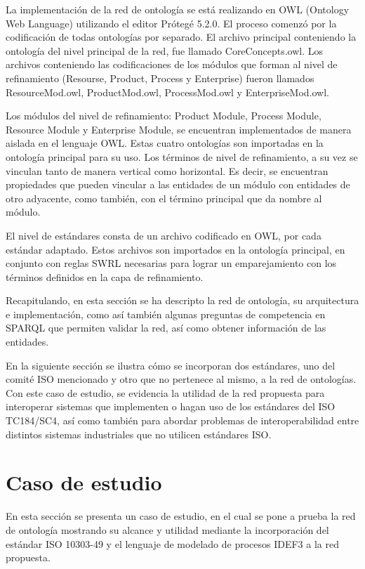 \documentclass[journal]{IEEEtran}
\begin{document}
La implementaci\'on de la red de ontolog\'ia se est\'a realizando en OWL (Ontology Web Language) utilizando el editor Pr\'oteg\'e 5.2.0. El proceso comenz\'o por la codificaci\'on de todas ontolog\'ias por separado. El archivo principal conteniendo la ontolog\'ia del nivel principal de la red, fue llamado CoreConcepts.owl. Los archivos conteniendo las codificaciones de los m\'odulos que forman al nivel de refinamiento (Resourse, Product, Process y Enterprise) fueron llamados ResourceMod.owl, ProductMod.owl, ProcessMod.owl y EnterpriseMod.owl. 

Los m\'odulos del nivel de refinamiento: Product Module, Process Module, Resource Module y Enterprise Module, se encuentran implementados de manera aislada en el lenguaje OWL. Estas cuatro ontolog\'ias son importadas en la ontolog\'ia   principal para su uso. Los t\'erminos de nivel de refinamiento, a su vez se vinculan tanto de manera vertical como horizontal. Es decir, se encuentran propiedades que pueden vincular a las entidades de un m\'odulo con entidades de otro adyacente, como tambi\'en, con el t\'ermino principal que da nombre al m\'odulo. 

El nivel de est\'andares consta de un archivo codificado en OWL, por cada est\'andar adaptado. Estos archivos son importados en la ontolog\'ia principal, en conjunto con reglas SWRL necesarias para lograr un emparejamiento con los t\'erminos definidos en la capa de refinamiento.

Recapitulando, en esta secci\'on se ha descripto la red de ontolog\'ia, su arquitectura e implementaci\'on, como as\'i tambi\'en algunas preguntas de competencia en SPARQL que permiten validar la red, as\'i como obtener informaci\'on de las entidades. 

En la siguiente secci\'on se ilustra c\'omo se incorporan dos est\'andares, uno del comit\'e ISO mencionado y otro que no pertenece al mismo, a la red de ontolog\'ias. Con este caso de estudio, se evidencia la utilidad de la red propuesta para interoperar sistemas que implementen o hagan uso de los est\'andares del ISO TC184/SC4, as\'i como tambi\'en para abordar problemas de interoperabilidad entre distintos sistemas industriales que no utilicen est\'andares ISO.

\section{Caso de estudio}

En esta secci\'on se presenta un caso de estudio, en el cual se pone a prueba la red de ontolog\'ia mostrando su alcance y utilidad mediante la incorporaci\'on del est\'andar ISO 10303-49 y el lenguaje de modelado de procesos IDEF3 a la red propuesta.
\end{document}
